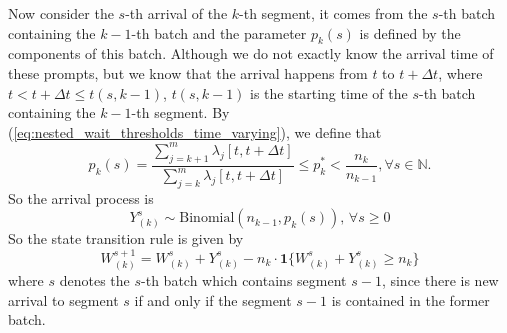 \documentclass[preprint]{article}
\theoremstyle{plain}
\theoremstyle{definition}
\theoremstyle{remark}
\begin{document}
Now consider the $s$-th arrival of the $k$-th segment, it comes from the $s$-th batch containing the $k-1$-th batch and the parameter $p_k(s)$ is defined by the components of this batch. Although we do not exactly know the arrival time of these prompts, but we know that the arrival happens from $t$ to $t+\Delta t$, where $t<t+\Delta t \leq t(s,k-1)$, $t(s,k-1)$ is the starting time of the $s$-th batch containing the $k-1$-th segment. By (\ref{eq:nested_wait_thresholds_time_varying}), we define that
$$p_k(s) = \frac{\sum_{j=k+1}^m \lambda_j[ t, t+\Delta t ]}{\sum_{j=k}^m \lambda_j[ t, t+\Delta t ]}\leq p_k^* < \frac{n_k}{n_{k-1}}, \forall s \in \mathbb{N}.$$
So the arrival process is 
$$Y_{(k)}^s \sim \text{Binomial}(n_{k-1},p_k(s)),\, \forall s\geq 0$$
So the state transition rule is given by
$$W_{(k)}^{s+1} = W_{(k)}^{s} + Y_{(k)}^{s} - n_k \cdot\mathbf{1}\{ W_{(k)}^{s} + Y_{(k)}^{s}\geq n_k \} $$
where $s$ denotes the $s$-th batch which contains segment $s-1$, since there is new arrival to segment $s$ if and only if the segment $s-1$ is contained in the former batch.
\end{document}
